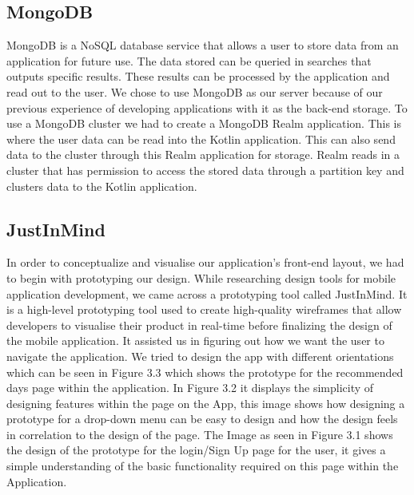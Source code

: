 \subsection{MongoDB}
MongoDB is a NoSQL database service that allows a user to store data from an application for future use. The data stored can be queried in searches that outputs specific results. These results can be processed by the application and read out to the user. We chose to use MongoDB as our server because of our previous experience of developing applications with it as the back-end storage.
\newline
\newline
To use a MongoDB cluster we had to create a MongoDB Realm application. This is where the user data can be read into the Kotlin application. This can also send data to the cluster through this Realm application for storage. Realm reads in a cluster that has permission to access the stored data through a partition key and clusters data to the Kotlin application.
\subsection{JustInMind}
In order to conceptualize and visualise our application's front-end layout, we had to begin with prototyping our design. While researching design tools for mobile application development, we came across a prototyping tool called JustInMind.
\newline
\newline
It is a high-level prototyping tool used to create high-quality wireframes that allow developers to visualise their product in real-time before finalizing the design of the mobile application. It assisted us in figuring out how we want the user to navigate the application.
\newline
\newline
We tried to design the app with different orientations which can be seen in Figure 3.3 which shows the prototype for the recommended days page within the application.
\newline
\newline
In Figure 3.2 it displays the simplicity of designing features within the page on the App, this image shows how designing a prototype for a drop-down menu can be easy to design and how the design feels in correlation to the design of the page.
\newline
\newline
The Image as seen in Figure 3.1 shows the design of the prototype for the login/Sign Up page for the user, it gives a simple understanding of the basic functionality required on this page within the Application.

